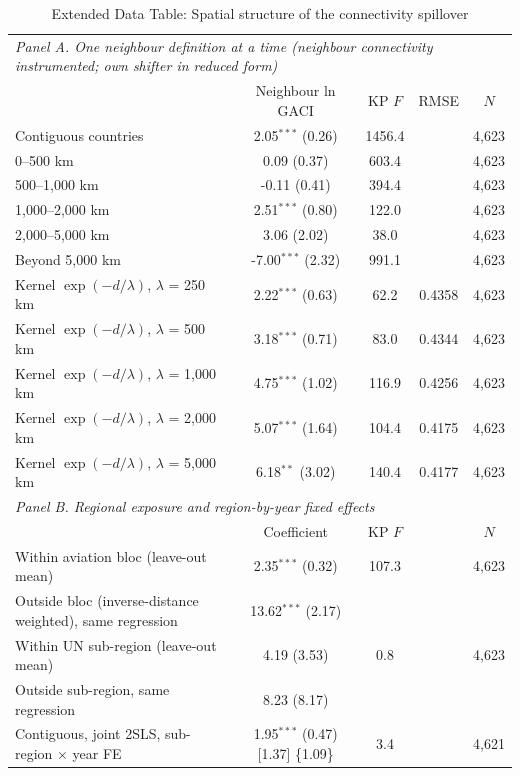 \begin{table}[htbp]
\centering
\begin{threeparttable}
\caption{Extended Data Table: Spatial structure of the connectivity spillover}
\label{tab:spill_ext}
\scriptsize
\begin{tabular}{lcccc}
\toprule
\multicolumn{5}{l}{\textit{Panel A. One neighbour definition at a time (neighbour connectivity instrumented; own shifter in reduced form)}} \\
 & Neighbour ln GACI & KP $F$ & RMSE & $N$ \\
\midrule
  Contiguous countries & 2.05$^{***}$ (0.26) & 1456.4 & & 4,623 \\
  0--500 km & 0.09 (0.37) & 603.4 & & 4,623 \\
  500--1,000 km & -0.11 (0.41) & 394.4 & & 4,623 \\
  1,000--2,000 km & 2.51$^{***}$ (0.80) & 122.0 & & 4,623 \\
  2,000--5,000 km & 3.06 (2.02) & 38.0 & & 4,623 \\
  Beyond 5,000 km & -7.00$^{***}$ (2.32) & 991.1 & & 4,623 \\
  Kernel $\exp(-d/\lambda)$, $\lambda$ = 250 km & 2.22$^{***}$ (0.63) & 62.2 & 0.4358 & 4,623 \\
  Kernel $\exp(-d/\lambda)$, $\lambda$ = 500 km & 3.18$^{***}$ (0.71) & 83.0 & 0.4344 & 4,623 \\
  Kernel $\exp(-d/\lambda)$, $\lambda$ = 1,000 km & 4.75$^{***}$ (1.02) & 116.9 & 0.4256 & 4,623 \\
  Kernel $\exp(-d/\lambda)$, $\lambda$ = 2,000 km & 5.07$^{***}$ (1.64) & 104.4 & 0.4175 & 4,623 \\
  Kernel $\exp(-d/\lambda)$, $\lambda$ = 5,000 km & 6.18$^{**}$ (3.02) & 140.4 & 0.4177 & 4,623 \\
\midrule
\multicolumn{5}{l}{\textit{Panel B. Regional exposure and region-by-year fixed effects}} \\
 & Coefficient & KP $F$ & & $N$ \\
  Within aviation bloc (leave-out mean) & 2.35$^{***}$ (0.32) & 107.3 & & 4,623 \\
  Outside bloc (inverse-distance weighted), same regression & 13.62$^{***}$ (2.17) & & & \\
  Within UN sub-region (leave-out mean) & 4.19 (3.53) & 0.8 & & 4,623 \\
  Outside sub-region, same regression & 8.23 (8.17) & & & \\
  Contiguous, joint 2SLS, sub-region $\times$ year FE & 1.95$^{***}$ (0.47) [1.37] \{1.09\} & 3.4 & & 4,621 \\

\end{tabular}
\end{threeparttable}
\end{table}
